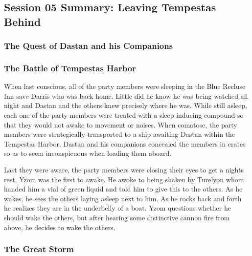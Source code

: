 \subsection{Session 05 Summary: Leaving Tempestas Behind}

\subsubsection{The Quest of Dastan and his Companions}

\subsubsection{The Battle of Tempestas Harbor}

When last conscious, all of the party members were sleeping in the Blue Recluse Inn save Darris who was back home. Little did he know he was being watched all night and Dastan and the others knew precisely where he was. While still asleep, each one of the party members were treated with a sleep inducing compound so that they would not awake to movement or noises. When comatose, the party members were strategically transported to a ship awaiting Dastan within the Tempestas Harbor. Dastan and his companions concealed the members in crates so as to seem inconspicuous when loading them aboard.

Last they were aware, the party members were closing their eyes to get a nights rest. Yzom was the first to awake. He awoke to being shaken by Turelyon whom handed him a vial of green liquid and told him to give this to the others. As he wakes, he sees the others laying asleep next to him. As he rocks back and forth he realizes they are in the underbelly of a boat. Yzom questions whether he should wake the others, but after hearing some distinctive cannon fire from above, he decides to wake the others.



\subsubsection{The Great Storm}